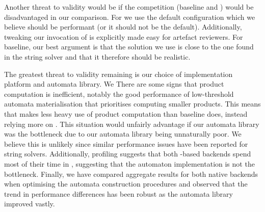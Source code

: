 Another threat to validity would be if the competition (baseline and \Nuxmv)
would be disadvantaged in our comparison. For \Nuxmv{} we use the default
configuration which we believe should be performant (or it should not be the
default). Additionally, tweaking our invocation of \Nuxmv{} is explicitly made
easy for artefact reviewers. For baseline, our best argument is that the
solution we use is close to the one found in the \Ostrich{} string solver and
that it therefore should be realistic.

The greatest threat to validity remaining is our choice of implementation
platform and automata library. We There are some signs that product computation
is inefficient, notably the good performance of low-threshold automata
materialisation that prioritises computing smaller products. This means that
\Calculus{} makes less heavy use of product computation than baseline does,
instead relying more on \Princess{}. This situation would unfairly advantage
\Calculus{} if our automata library was the bottleneck due to our automata
library being unnaturally poor. We believe this is unlikely since similar
performance issues have been reported for string solvers. Additionally,
profiling suggests that both \Princess{}-based backends spend most of their time
in \Princess{}, suggesting that the automaton implementation is not the
bottleneck. Finally, we have compared aggregate results for both native backends
when optimising the automata construction procedures and observed that the trend
in performance differences has been robust as the automata library improved
vastly.